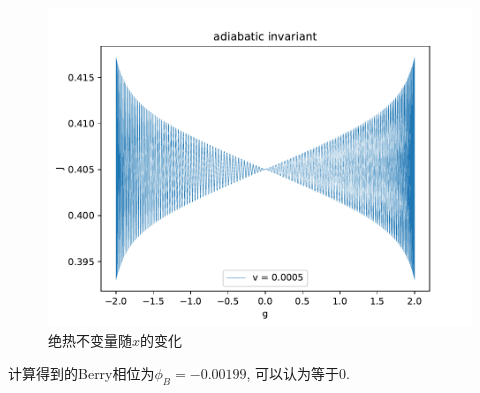 \documentclass[a4paper,zihao=5,UTF8]{ctexart}
\begin{document}
    \begin{figure}[htbp]
        \centering
        \includegraphics[scale=0.6]{4x_ad_invr_v=0_0005.pdf}
        \caption{绝热不变量随$x$的变化}
        \label{4 x ad}
    \end{figure}
    \par 
    计算得到的Berry相位为$\phi_B = -0.00199$, 可以认为等于0. 
\end{document}
